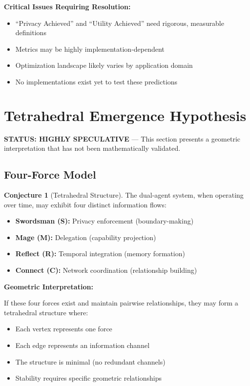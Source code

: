 \documentclass[11pt,a4paper]{article}
\theoremstyle{definition}
\newtheorem{conjecture}{Conjecture}[section]
\begin{document}
\textbf{Critical Issues Requiring Resolution:}

\begin{itemize}
    \item ``Privacy Achieved'' and ``Utility Achieved'' need rigorous, measurable definitions
    \item Metrics may be highly implementation-dependent
    \item Optimization landscape likely varies by application domain
    \item No implementations exist yet to test these predictions
\end{itemize}

\section{Tetrahedral Emergence Hypothesis}

\textbf{STATUS: HIGHLY SPECULATIVE} --- This section presents a geometric interpretation that has not been mathematically validated.

\subsection{Four-Force Model}

\begin{conjecture}[Tetrahedral Structure]
The dual-agent system, when operating over time, may exhibit four distinct information flows:

\begin{itemize}
    \item \textbf{Swordsman (S):} Privacy enforcement (boundary-making)
    \item \textbf{Mage (M):} Delegation (capability projection)
    \item \textbf{Reflect (R):} Temporal integration (memory formation)
    \item \textbf{Connect (C):} Network coordination (relationship building)
\end{itemize}
\end{conjecture}

\textbf{Geometric Interpretation:}

If these four forces exist and maintain pairwise relationships, they may form a tetrahedral structure where:

\begin{itemize}
    \item Each vertex represents one force
    \item Each edge represents an information channel
    \item The structure is minimal (no redundant channels)
    \item Stability requires specific geometric relationships
\end{itemize}
\end{document}
